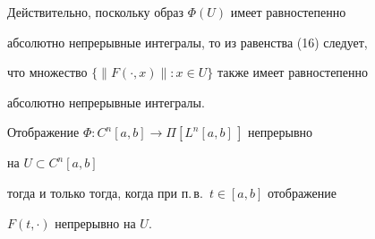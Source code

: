 Действительно, поскольку образ $\Phi(U)$ имеет равностепенно


абсолютно непрерывные интегралы, то из равенства (16) следует,


что множество $\{\|F(\cdot,x)\|:x\in U\}$ также имеет равностепенно


абсолютно непрерывные интегралы.





\begin{thm} Отображение $\Phi:C^n[a,b]\to\Pi[L^n[a,b]\,]$ непрерывно


на $U\subset C^n[a,b]$


тогда и только тогда, когда при п.\,в.~$t\in[a,b]$ отображение


$F(t,\cdot)$ непрерывно на $U$.


\end{thm}






